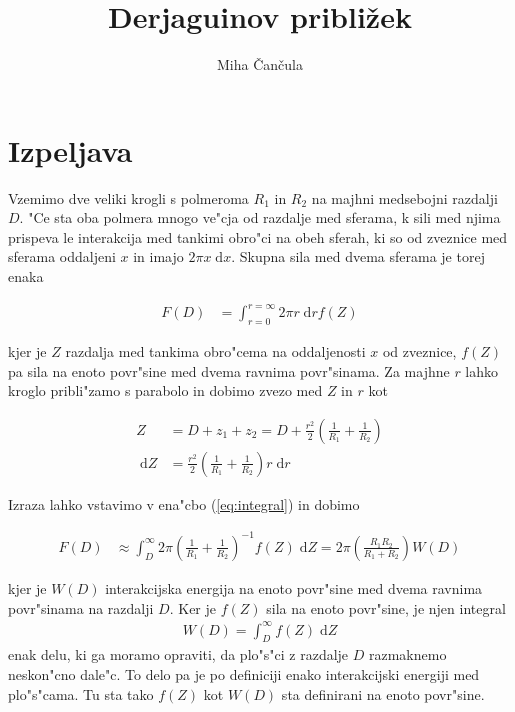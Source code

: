 \documentclass[a4paper,10pt]{article}
\title{Derjaguinov pribli\v zek}
\author{Miha \v Can\v cula}
\newcommand{\dd}{\;\mathrm{d}}
\begin{document}
\maketitle

\section{Izpeljava}

Vzemimo dve veliki krogli s polmeroma $R_1$ in $R_2$ na majhni medsebojni razdalji $D$. 
"Ce sta oba polmera mnogo ve"cja od razdalje med sferama, k sili med njima prispeva le interakcija med tankimi obro"ci na obeh sferah, ki so od zveznice med sferama oddaljeni $x$ in imajo $2\pi x \dd x$. 
Skupna sila med dvema sferama je torej enaka

\begin{align}
\label{eq:integral}
 F(D) &= \int_{r=0}^{r=\infty} 2\pi r \dd r f(Z)
\end{align}

kjer je $Z$ razdalja med tankima obro"cema na oddaljenosti $x$ od zveznice, $f(Z)$ pa sila na enoto povr"sine med dvema ravnima povr"sinama. 
Za majhne $r$ lahko kroglo pribli"zamo s parabolo in dobimo zvezo med $Z$ in $r$ kot

\begin{align}
 Z &= D + z_1 + z_2 = D + \frac{r^2}{2} \left(\frac{1}{R_1} + \frac{1}{R_2}\right) \\
 \dd Z &= \frac{r^2}{2} \left(\frac{1}{R_1} + \frac{1}{R_2}\right)r \dd r
\end{align}

Izraza lahko vstavimo v ena"cbo (\ref{eq:integral}) in dobimo

\begin{align}
 F(D) &\approx \int_D^\infty 2\pi \left(\frac{1}{R_1} + \frac{1}{R_2}\right)^{-1}f(Z) \dd Z = 2\pi \left(\frac{R_1R_2}{R_1 + R_2}\right) W(D)
\end{align}

kjer je $W(D)$ interakcijska energija na enoto povr"sine med dvema ravnima povr"sinama na razdalji $D$. Ker je $f(Z)$ sila na enoto povr"sine, je njen integral
\begin{align}
  W(D) = \int_D^{\infty} f(Z) \dd Z 
\end{align}
enak delu, ki ga moramo opraviti, da plo"s"ci z razdalje $D$ razmaknemo neskon"cno dale"c. 
To delo pa je po definiciji enako interakcijski energiji med plo"s"cama. 
Tu sta tako $f(Z)$ kot $W(D)$ sta definirani na enoto povr"sine. 
\end{document}
